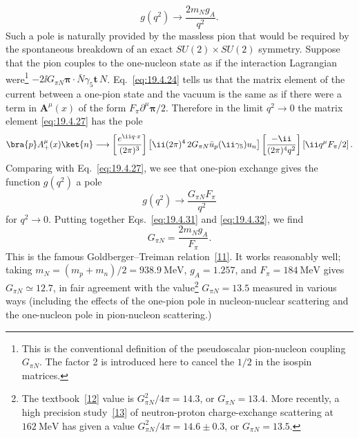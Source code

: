 \begin{equation}
g(q^2)\longrightarrow\frac{2m_Ng_A}{q^2}.
\tag{19.4.31}\label{eq:19.4.31}
\end{equation}
Such a pole is naturally provided by the massless pion that would be required by the spontaneous breakdown of an exact $SU(2)\times SU(2)$ symmetry. Suppose that the pion couples to the one-nucleon state as if the interaction Lagrangian were\footnote{This is the conventional definition of the pseudoscalar pion-nucleon coupling $G_{\pi N}$. The factor 2 is introduced here to cancel the $1/2$ in the isospin matrices.} $-2\ii G_{\pi N}\boldsymbol{\pi}\cdot\bar N\gamma_5\mathbf{t}\,N$. Eq.~\eqref{eq:19.4.24} tells us that the matrix element of the current between a one-pion state and the vacuum is the same as if there were a term in $\mathbf{A}^\mu(x)$ of the form $F_\pi\partial^\mu\boldsymbol{\pi}/2$. Therefore in the limit $q^2\to0$ the matrix element \eqref{eq:19.4.27} has the pole
\[
\bra{p}A_+^\mu(x)\ket{n}
\longrightarrow
\left[\frac{e^{\ii q\cdot x}}{(2\pi)^3}\right]
\left[\ii(2\pi)^4\,2G_{\pi N}\bar u_p(\ii\gamma_5)u_n\right]
\left[\frac{-\ii}{(2\pi)^4q^2}\right]
\left[\ii q^\mu F_\pi/2\right].
\]
Comparing with Eq.~\eqref{eq:19.4.27}, we see that one-pion exchange gives the function $g(q^2)$ a pole
\begin{equation}
g(q^2)\longrightarrow\frac{G_{\pi N}F_\pi}{q^2}
\tag{19.4.32}\label{eq:19.4.32}
\end{equation}
for $q^2\to0$. Putting together Eqs.~\eqref{eq:19.4.31} and \eqref{eq:19.4.32}, we find
\begin{equation}
G_{\pi N}=\frac{2m_Ng_A}{F_\pi}.
\tag{19.4.33}\label{eq:19.4.33}
\end{equation}
This is the famous Goldberger--Treiman relation~\hyperref[ch19-ref-11]{[11]}. It works reasonably well; taking $m_N=(m_p+m_n)/2=938.9\ \mathrm{MeV}$, $g_A=1.257$, and $F_\pi=184\ \mathrm{MeV}$ gives $G_{\pi N}\simeq12.7$, in fair agreement with the value\footnote{The textbook~\hyperref[ch19-ref-12]{[12]} value is $G_{\pi N}^2/4\pi=14.3$, or $G_{\pi N}=13.4$. More recently, a high precision study~\hyperref[ch19-ref-13]{[13]} of neutron-proton charge-exchange scattering at $162\ \mathrm{MeV}$ has given a value $G_{\pi N}^2/4\pi=14.6\pm0.3$, or $G_{\pi N}=13.5$.} $G_{\pi N}=13.5$ measured in various ways (including the effects of the one-pion pole in nucleon-nuclear scattering and the one-nucleon pole in pion-nucleon scattering.)

